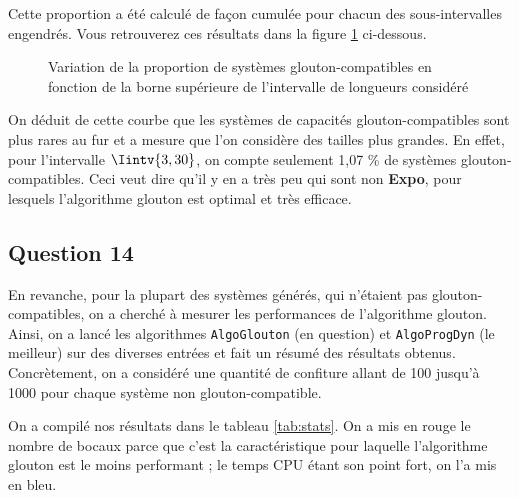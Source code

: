 \documentclass[12pt,a4paper]{article}
\begin{document}
 Cette proportion a \'et\'e calcul\'e de fa\c{c}on cumul\'ee pour chacun des sous-intervalles engendr\'es. Vous retrouverez ces r\'esultats dans la figure \ref{fig:prop} ci-dessous.
 
\begin{figure}[!h]
  \centering
  \captionsetup{justification=centering}
  \caption[Variation de la proportion de syst\`emes glouton-compatibles]{Variation de la proportion de syst\`emes glouton-compatibles en fonction de la borne sup\'erieure de l'intervalle de longueurs consid\'er\'e}
  \label{fig:prop}
\end{figure}

On d\'eduit de cette courbe que les syst\`emes de capacit\'es glouton-compatibles sont plus rares au fur et a mesure que l'on consid\`ere des tailles plus grandes. En effet, pour l'intervalle $\Iintv{3,30}$, on compte seulement 1,07 \% de syst\`emes glouton-compatibles. Ceci veut dire qu'il y en a tr\`es peu qui sont non {\bfseries Expo}, pour lesquels l'algorithme glouton est optimal et tr\`es efficace.

 \subsection*{Question 14}
 En revanche, pour la plupart des syst\`emes g\'en\'er\'es, qui n'\'etaient pas glouton-compatibles, on a cherch\'e \`a mesurer les performances de l'algorithme glouton. Ainsi, on a lanc\'e les algorithmes \texttt{AlgoGlouton} (en question) et \texttt{AlgoProgDyn} (le meilleur) sur des diverses entr\'ees et fait un r\'esum\'e des r\'esultats obtenus. Concr\`etement, on a consid\'er\'e une quantit\'e de confiture allant de 100 jusqu'\`a 1000 pour chaque syst\`eme non glouton-compatible.
 
 On a compil\'e nos r\'esultats dans le tableau \ref{tab:stats}. On a mis en rouge le nombre de bocaux parce que c'est la caract\'eristique pour laquelle l'algorithme glouton est le moins performant ; le temps CPU \'etant son point fort, on l'a mis en bleu.
 
\end{document}
